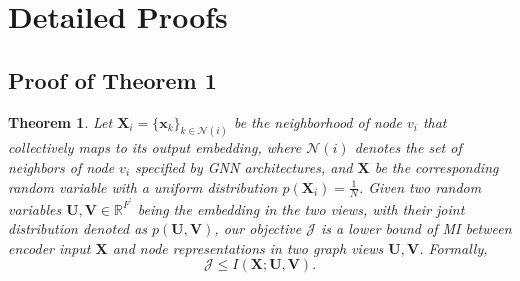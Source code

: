 \documentclass{article}
\newtheorem{theorem}{Theorem}[section]
\theoremstyle{remark}
\begin{document}
\section{Detailed Proofs}
\label{appendix:proofs}

\subsection{Proof of Theorem 1}

\begin{theorem}
\label{thm:objective-InfoMax}
Let \(\mathbf{X}_i = \{ \bm{x}_k \}_{k \in \mathcal{N}(i)}\) be the neighborhood of node \(v_i\) that collectively maps to its output embedding, where \(\mathcal{N}(i)\) denotes the set of neighbors of node \(v_i\) specified by GNN architectures, and \(\mathbf{X}\) be the corresponding random variable with a uniform distribution \(p(\mathbf{X}_i) = \frac{1}{N}\). Given two random variables \(\mathbf{U, V} \in \mathbb{R}^{F^\prime}\) being the embedding in the two views, with their joint distribution denoted as \(p(\mathbf{U}, \mathbf{V})\), our objective \(\mathcal{J}\) is a lower bound of MI between encoder input \(\mathbf{X}\) and node representations in two graph views \(\mathbf{U, V}\). Formally,
\begin{equation}
	\mathcal{J} \leq I(\mathbf{X}; \mathbf{U}, \mathbf{V}).
\end{equation}
\end{theorem}
\end{document}
